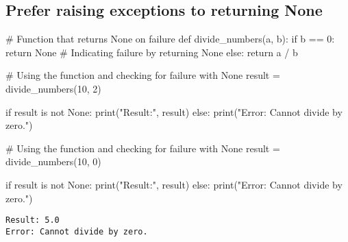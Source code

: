 \documentclass[
]{report}
\newenvironment{Shaded}{\begin{snugshade}}{\end{snugshade}}
\newcommand{\BuiltInTok}[1]{\textcolor[rgb]{0.00,0.23,0.31}{#1}}
\newcommand{\CommentTok}[1]{\textcolor[rgb]{0.37,0.37,0.37}{#1}}
\newcommand{\ControlFlowTok}[1]{\textcolor[rgb]{0.00,0.23,0.31}{#1}}
\newcommand{\DecValTok}[1]{\textcolor[rgb]{0.68,0.00,0.00}{#1}}
\newcommand{\KeywordTok}[1]{\textcolor[rgb]{0.00,0.23,0.31}{#1}}
\newcommand{\NormalTok}[1]{\textcolor[rgb]{0.00,0.23,0.31}{#1}}
\newcommand{\OperatorTok}[1]{\textcolor[rgb]{0.37,0.37,0.37}{#1}}
\newcommand{\StringTok}[1]{\textcolor[rgb]{0.13,0.47,0.30}{#1}}
\newcommand{\VariableTok}[1]{\textcolor[rgb]{0.07,0.07,0.07}{#1}}
\begin{document}
\hypertarget{prefer-raising-exceptions-to-returning-none}{%
\subsection{Prefer raising exceptions to returning
None}\label{prefer-raising-exceptions-to-returning-none}}

\begin{Shaded}
\begin{Highlighting}[]
\CommentTok{\# Function that returns None on failure}
\KeywordTok{def}\NormalTok{ divide\_numbers(a, b):}
    \ControlFlowTok{if}\NormalTok{ b }\OperatorTok{==} \DecValTok{0}\NormalTok{:}
        \ControlFlowTok{return} \VariableTok{None}  \CommentTok{\# Indicating failure by returning None}
    \ControlFlowTok{else}\NormalTok{:}
        \ControlFlowTok{return}\NormalTok{ a }\OperatorTok{/}\NormalTok{ b}

\CommentTok{\# Using the function and checking for failure with None}
\NormalTok{result }\OperatorTok{=}\NormalTok{ divide\_numbers(}\DecValTok{10}\NormalTok{, }\DecValTok{2}\NormalTok{)}

\ControlFlowTok{if}\NormalTok{ result }\KeywordTok{is} \KeywordTok{not} \VariableTok{None}\NormalTok{:}
    \BuiltInTok{print}\NormalTok{(}\StringTok{"Result:"}\NormalTok{, result)}
\ControlFlowTok{else}\NormalTok{:}
    \BuiltInTok{print}\NormalTok{(}\StringTok{"Error: Cannot divide by zero."}\NormalTok{)}

\CommentTok{\# Using the function and checking for failure with None}
\NormalTok{result }\OperatorTok{=}\NormalTok{ divide\_numbers(}\DecValTok{10}\NormalTok{, }\DecValTok{0}\NormalTok{)}

\ControlFlowTok{if}\NormalTok{ result }\KeywordTok{is} \KeywordTok{not} \VariableTok{None}\NormalTok{:}
    \BuiltInTok{print}\NormalTok{(}\StringTok{"Result:"}\NormalTok{, result)}
\ControlFlowTok{else}\NormalTok{:}
    \BuiltInTok{print}\NormalTok{(}\StringTok{"Error: Cannot divide by zero."}\NormalTok{)}
\end{Highlighting}
\end{Shaded}

\begin{verbatim}
Result: 5.0
Error: Cannot divide by zero.
\end{verbatim}
\end{document}
